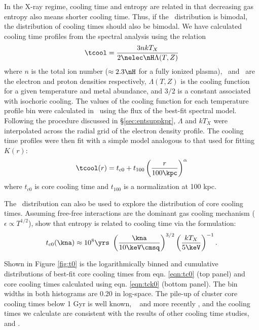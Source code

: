 In the X-ray regime, cooling time and entropy are related in that
decreasing gas entropy also means shorter cooling time. Thus, if the
\kna\ distribution is bimodal, the distribution of cooling times
should also be bimodal. We have calculated cooling time profiles from
the spectral analysis using the relation
\begin{equation}
\tcool = \frac{3nkT_X}{2\nelec \nH \Lambda(T,Z)}
\label{eqn:tcool}
\end{equation}
where $n$ is the total ion number ($\approx 2.3\nH$ for a fully
ionized plasma), \nelec\ and \nH\ are the electron and proton
densities respectively, $\Lambda(T,Z)$ is the cooling function for a
given temperature and metal abundance, and $3/2$ is a constant
associated with isochoric cooling. The values of the cooling function
for each temperature profile bin were calculated in \xspec\ using the
flux of the best-fit spectral model. Following the procedure discussed
in \S\ref{sec:entsuppkpr}, $\Lambda$ and $kT_X$ were interpolated across the
radial grid of the electron density profile. The cooling time profiles
were then fit with a simple model analogous to that used for fitting
$K(r)$:
\begin{equation}
\tcool(r) = t_{c0} + t_{100} \left(\frac{r}{100 \kpc}\right)^{\alpha}
\label{eqn:tc0}
\end{equation}
where $t_{c0}$ is core cooling time and $t_{100}$ is a normalization
at 100 kpc.

The \kna\ distribution can also be used to explore the distribution of
core cooling times. Assuming free-free interactions are the dominant
gas cooling mechanism (\ie\ $\epsilon \propto T^{1/2}$),
\citet{radioquiet} show that entropy is related to cooling time via
the formulation:
\begin{equation}
t_{c0}(\kna) \approx 10^8 \yrs\ \left(\frac{\kna}{10 \keV \cmsq}\right)^{3/2} \left(\frac{kT_X}{5 \keV}\right)^{-1}.
\label{eqn:tck0}
\end{equation}

Shown in Figure \ref{fig:t0} is the logarithmically binned and
cumulative distributions of best-fit core cooling times from
eqn. \ref{eqn:tc0} (top panel) and core cooling times calculated using
eqn. \ref{eqn:tck0} (bottom panel). The bin widths in both histograms
are 0.20 in log-space. The pile-up of cluster core cooling times below
1 Gyr is well known, \eg\ \citet{hu85} and more recently
\citet{dunn08}, and the cooling times we calculate are consistent with
the results of other cooling time studies,
\eg\ \citet{1998MNRAS.298..416P} and \citet{2008arXiv0802.1864R}.

